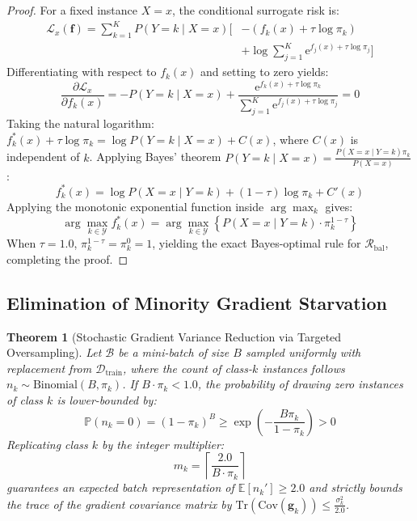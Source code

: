 \documentclass[final,5p,times,twocolumn]{elsarticle}
\newtheorem{theorem}{Theorem}
\begin{document}
\begin{proof}
For a fixed instance $X=x$, the conditional surrogate risk is:
\begin{equation}
\begin{aligned}
    \mathcal{L}_x(\mathbf{f}) = \sum_{k=1}^K P(Y=k \mid X=x) \Big[ & -(f_k(x) + \tau \log \pi_k) \\
    & + \log \sum_{j=1}^K \mathrm{e}^{f_j(x) + \tau \log \pi_j} \Big]
\end{aligned}
\end{equation}
Differentiating with respect to $f_k(x)$ and setting to zero yields:
\begin{equation}
    \frac{\partial \mathcal{L}_x}{\partial f_k(x)} = -P(Y=k \mid X=x) + \frac{\mathrm{e}^{f_k(x) + \tau \log \pi_k}}{\sum_{j=1}^K \mathrm{e}^{f_j(x) + \tau \log \pi_j}} = 0
\end{equation}
Taking the natural logarithm: $f_k^*(x) + \tau \log \pi_k = \log P(Y=k \mid X=x) + C(x)$, where $C(x)$ is independent of $k$. Applying Bayes' theorem $P(Y=k \mid X=x) = \frac{P(X=x \mid Y=k)\pi_k}{P(X=x)}$:
\begin{equation}
    f_k^*(x) = \log P(X=x \mid Y=k) + (1 - \tau) \log \pi_k + C'(x)
\end{equation}
Applying the monotonic exponential function inside $\arg\max_k$ gives:
\begin{equation}
    \arg\max_{k \in \mathcal{Y}} f_k^*(x) = \arg\max_{k \in \mathcal{Y}} \left\{ P(X=x \mid Y=k) \cdot \pi_k^{1 - \tau} \right\}
\end{equation}
When $\tau = 1.0$, $\pi_k^{1-\tau} = \pi_k^0 = 1$, yielding the exact Bayes-optimal rule for $\mathcal{R}_{\text{bal}}$, completing the proof.
\end{proof}

\subsection{Elimination of Minority Gradient Starvation}
\label{subsec:starvation}

\begin{theorem}[Stochastic Gradient Variance Reduction via Targeted Oversampling]
\label{thm:gradient_starvation}
Let $\mathcal{B}$ be a mini-batch of size $B$ sampled uniformly with replacement from $\mathcal{D}_{\text{train}}$, where the count of class-$k$ instances follows $n_k \sim \text{Binomial}(B, \pi_k)$. If $B \cdot \pi_k < 1.0$, the probability of drawing zero instances of class $k$ is lower-bounded by:
\begin{equation}
    \mathbb{P}(n_k = 0) = (1 - \pi_k)^B \ge \exp\left(-\frac{B \pi_k}{1 - \pi_k}\right) > 0
\end{equation}
Replicating class $k$ by the integer multiplier:
\begin{equation}
    m_k = \left\lceil \frac{2.0}{B \cdot \pi_k} \right\rceil
\end{equation}
guarantees an expected batch representation of $\mathbb{E}[n_k'] \ge 2.0$ and strictly bounds the trace of the gradient covariance matrix by $\mathrm{Tr}(\mathrm{Cov}(\mathbf{g}_k)) \le \frac{\sigma_k^2}{2.0}$.
\end{theorem}
\end{document}
